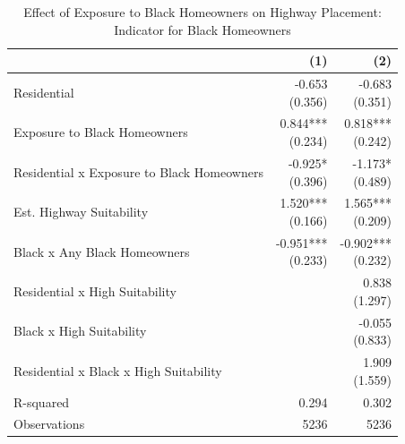 \begin{table}[h]
\centering
\caption{Effect of Exposure to Black Homeowners on Highway Placement: Indicator for Black Homeowners}
\label{tab:results/black_homeowners_indicator}
\begin{threeparttable}
\begin{tabular*}{0.8\textwidth}{@{\extracolsep{\fill}}l*{2}{r}}
\toprule
 & (1) & (2) \\
\midrule
Residential & \makecell[tr]{-0.653 \\ (0.356)} & \makecell[tr]{-0.683 \\ (0.351)} \\
Exposure to Black Homeowners & \makecell[tr]{0.844{***} \\ (0.234)} & \makecell[tr]{0.818{***} \\ (0.242)} \\
Residential x Exposure to Black Homeowners & \makecell[tr]{-0.925{*} \\ (0.396)} & \makecell[tr]{-1.173{*} \\ (0.489)} \\
Est. Highway Suitability & \makecell[tr]{1.520{***} \\ (0.166)} & \makecell[tr]{1.565{***} \\ (0.209)} \\
Black x Any Black Homeowners & \makecell[tr]{-0.951{***} \\ (0.233)} & \makecell[tr]{-0.902{***} \\ (0.232)} \\
Residential x High Suitability &  & \makecell[tr]{0.838 \\ (1.297)} \\
Black x High Suitability &  & \makecell[tr]{-0.055 \\ (0.833)} \\
Residential x Black x High Suitability &  & \makecell[tr]{1.909 \\ (1.559)} \\
R-squared & 0.294 & 0.302 \\
Observations & 5236 & 5236 \\
\bottomrule
\end{tabular*}
\begin{tablenotes}[flushleft]
\footnotesize

\end{tablenotes}
\end{threeparttable}
\end{table}
